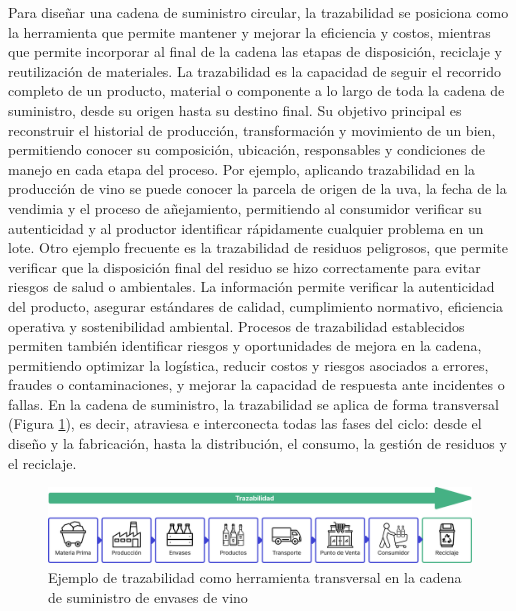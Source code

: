 Para diseñar una cadena de suministro circular, la trazabilidad se posiciona como la herramienta que permite mantener y mejorar la eficiencia y costos, mientras que permite incorporar al final de la cadena las etapas de disposición, reciclaje y reutilización de materiales. La trazabilidad es la capacidad de seguir el recorrido completo de un producto, material o componente a lo largo de toda la cadena de suministro, desde su origen hasta su destino final. Su objetivo principal es reconstruir el historial de producción, transformación y movimiento de un bien, permitiendo conocer su composición, ubicación, responsables y condiciones de manejo en cada etapa del proceso. Por ejemplo, aplicando trazabilidad en la producción de vino se puede conocer la parcela de origen de la uva, la fecha de la vendimia y el proceso de añejamiento, permitiendo al consumidor verificar su autenticidad y al productor identificar rápidamente cualquier problema en un lote. Otro ejemplo frecuente es la trazabilidad de residuos peligrosos, que permite verificar que la disposición final del residuo se hizo correctamente para evitar riesgos de salud o ambientales. La información permite verificar la autenticidad del producto, asegurar estándares de calidad, cumplimiento normativo, eficiencia operativa y sostenibilidad ambiental. Procesos de trazabilidad establecidos permiten también identificar riesgos y oportunidades de mejora en la cadena, permitiendo optimizar la logística, reducir costos y riesgos asociados a errores, fraudes o contaminaciones, y mejorar la capacidad de respuesta ante incidentes o fallas. En la cadena de suministro, la trazabilidad se aplica de forma transversal (Figura \ref{fig:supply-chain-traceability}), es decir, atraviesa e interconecta todas las fases del ciclo: desde el diseño y la fabricación, hasta la distribución, el consumo, la gestión de residuos y el reciclaje.

\begin{figure}[!tb]
    \centering
    \includegraphics[width=\textwidth]{Figures/supply-chain-traceability.png}
    \caption{Ejemplo de trazabilidad como herramienta transversal en la cadena de suministro de envases de vino}
    \label{fig:supply-chain-traceability}
\end{figure}

